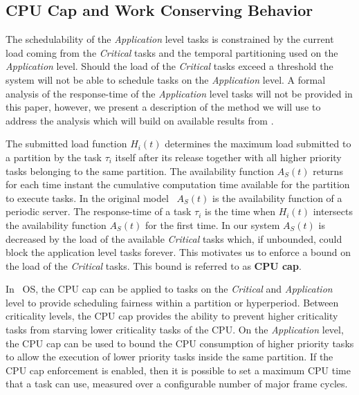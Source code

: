 \subsection{CPU Cap and Work Conserving Behavior}
\label{sec:CPUCAP}
The schedulability of the \emph{Application} level tasks is
constrained by the current load coming from the \emph{Critical} tasks
and the temporal partitioning used on the \emph{Application} level.
Should the load of the \emph{Critical} tasks exceed a threshold the system
will not be able to schedule tasks on the \emph{Application} level. A
formal analysis of the response-time of the \emph{Application} level
tasks will not be provided in this paper, however, we present a 
description of the method we will use to address the analysis which
will build on available results from
\cite{BaruahRTA4MCS, PartitionedRTA-Almeida04, 
HierarchicalRTA-Lipari05}.

The submitted load function $H_i(t)$ determines the maximum load
submitted to a partition by the task $\tau_i$ itself after its
release together with all higher priority tasks belonging to
the same partition. The availability function $A_S(t)$ returns for
each time instant the cumulative computation time available for the
partition to execute tasks. In the original model~\cite{PartitionedRTA-Almeida04}
$A_S(t)$ is the availability function of a periodic server.
 The response-time of a task $\tau_i$ is the time
when $H_i(t)$ intersects the availability function $A_S(t)$ for the
first time.  In our system $A_S(t)$ is decreased by the load of the
available \emph{Critical} tasks which, if unbounded, could block the
application level tasks forever. This motivates us to enforce a bound
on the load of the \emph{Critical} tasks. This bound is referred to as
{\bf CPU cap}.

In \iap\ OS, the CPU cap can be applied to tasks on the
\emph{Critical} and \emph{Application} level to provide scheduling
fairness within a partition or hyperperiod. Between criticality
levels, the CPU cap provides the ability to prevent higher
criticality tasks from starving lower criticality tasks of the CPU.
On the \emph{Application} level, the CPU cap can be used to bound
the CPU consumption of higher priority tasks to allow the execution
of lower priority tasks inside the same partition. If the CPU cap
enforcement is enabled, then it is possible to set a maximum CPU
time that a task can use, measured over a configurable number of
major frame cycles.

